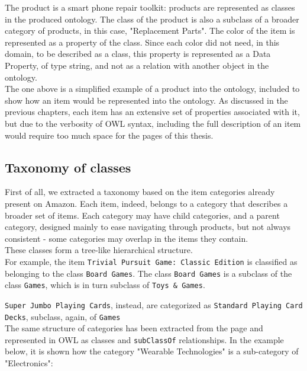 \documentclass[LaM,oneside,binding=0.6cm]{sapthesis}
\begin{document}
\bigskip

The product is a smart phone repair toolkit: products are represented as classes in the produced ontology. The class of the product is also a subclass of a broader category of products, in this case, "Replacement Parts". 
The color of the item is represented as a property of the class. Since each color did not need, in this domain, to be described as a class, this property is represented as a Data Property, of type string, and not as a relation with another object in the ontology.\\

The one above is a simplified example of a product into the ontology, included to show how an item would be represented into the ontology. As discussed in the previous chapters, each item has an extensive set of properties associated with it, but due to the verbosity of OWL syntax, including the full description of an item would require too much space for the pages of this thesis.

\subsection{Taxonomy of classes}

First of all, we extracted a taxonomy based on the item categories already present on Amazon. Each item, indeed, belongs to a category that describes a broader set of items. Each category may have child categories, and a parent category, designed mainly to ease navigating through products, but not always consistent - some categories may overlap in the items they contain.\\

These classes form a tree-like hierarchical structure. \\

For example, the item \texttt{Trivial Pursuit Game: Classic Edition} is classified as belonging to the class \texttt{Board Games}. The class \texttt{Board Games} is a subclass of the class \texttt{Games}, which is in turn subclass of \texttt{Toys \& Games}.

\texttt{Super Jumbo Playing Cards}, instead, are categorized as \texttt{Standard Playing Card Decks}, subclass, again, of \texttt{Games} \\

The same structure of categories has been extracted from the page and represented in OWL as classes and \texttt{subClassOf} relationships. In the example below, it is shown how the category "Wearable Technologies" is a sub-category of "Electronics":
\end{document}
